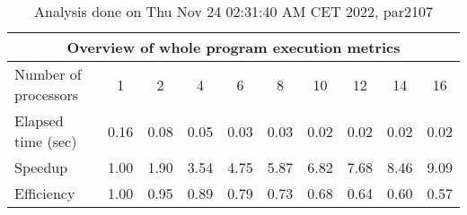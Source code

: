 \begin{table}[h]
\begin{center}
\begin{tabular}{|l|c|c|c|c|c|c|c|c|c|}
\hline
\multicolumn{10}{|c|}{Overview of whole program execution metrics} \\
\hline
\hline
Number of processors & 1 & 2 & 4 & 6 & 8 & 10 & 12 & 14 & 16 \\
\hline
Elapsed time (sec)      &       0.16 &       0.08 &       0.05 &       0.03 &       0.03 &       0.02 &       0.02 &       0.02 &       0.02 \\
\hline
Speedup                 &       1.00 &       1.90 &       3.54 &       4.75 &       5.87 &       6.82 &       7.68 &       8.46 &       9.09 \\
\hline
Efficiency              &       1.00 &       0.95 &       0.89 &       0.79 &       0.73 &       0.68 &       0.64 &       0.60 &       0.57 \\
\hline
\end{tabular}
\end{center}
\caption{ Analysis done on Thu Nov 24 02:31:40 AM CET 2022, par2107}
\end{table}
